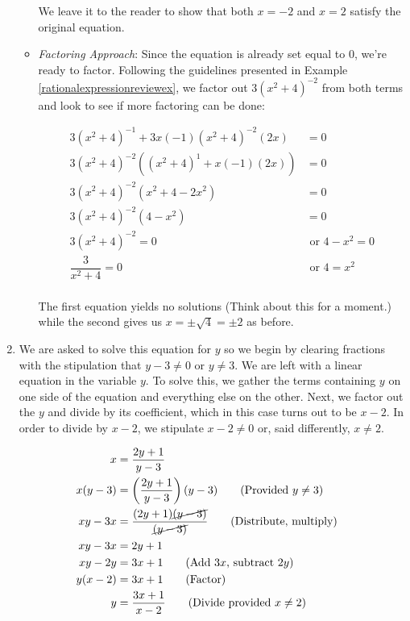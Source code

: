 \begin{ex}
\begin{enumerate}
\begin{itemize}
We leave it to the reader to show that both $x = -2$ and $x = 2$ satisfy the original equation.

\item  \textit{Factoring Approach}:  Since the equation is already set equal to $0$, we're ready to factor. Following the guidelines presented in Example \ref{rationalexpressionreviewex}, we factor out $3(x^2+4)^{-2}$ from both terms and look to see if more factoring can be done:

\begin{align*}
3(x^2+4)^{-1} + 3x(-1)(x^2+4)^{-2}(2x)& =  0 \\ 
3(x^2+4)^{-2}( (x^2+4)^{1} + x(-1)(2x)) & = 0 \tag{Factor} \\ 
3(x^2+4)^{-2}( x^2 + 4 - 2x^2 ) & = 0 \\ 
3(x^2+4)^{-2}(4 - x^2) & = 0 \tag{Gather like terms} \\ 
3(x^2+4)^{-2} = 0 & \text{ or } 4 - x^2 = 0 \tag{Zero Product Property} \\ 
\dfrac{3}{x^2+4} = 0 & \text{ or } 4 = x^2 \\
\end{align*}

The first equation yields no solutions (Think about this for a moment.) while the second gives us $x = \pm \sqrt{4} = \pm 2$ as before.

\end{itemize}

\item  We are asked to solve this equation for $y$ so we begin by clearing fractions with the stipulation that $y-3 \neq 0$ or $y \neq 3$.   We are left with a linear equation in the variable $y$.  To solve this, we gather the terms containing $y$ on one side of the equation and everything else on the other.  Next, we factor out the $y$ and divide by its coefficient, which in this case turns out to be $x-2$.  In order to divide by $x-2$, we stipulate $x - 2 \neq 0$ or, said differently, $x \neq 2$. 

\begin{align*}
x & = \dfrac{2y+1}{y-3} & \\ 
x(y-3) & = \left(\dfrac{2y+1}{y-3}\right)(y-3) \tag{Provided $y \neq 3$} \\ 
xy - 3x & = \dfrac{(2y+1)\cancel{(y-3)}}{\cancel{(y-3)}} \tag{Distribute, multiply} \\ 
xy - 3x & = 2y + 1 & \\ 
xy - 2y & = 3x+1 \tag{Add $3x$, subtract $2y$} \\ 
y(x-2) & = 3x+1 \tag{Factor} \\ 
y & = \dfrac{3x+1}{x-2} \tag{Divide provided $x \neq 2$} \\
\end{align*}


\end{enumerate}
\end{ex}
